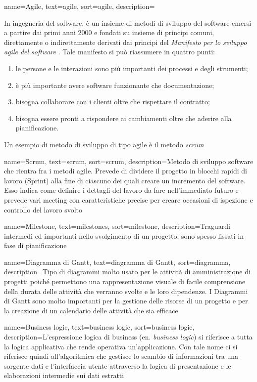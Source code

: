 {
    name=Agile,
    text=agile,
    sort=agile,
    description={In ingegneria del software, è un insieme di metodi di sviluppo del software emersi a partire dai primi anni 2000 e fondati su insieme di principi comuni, direttamente o indirettamente derivati dai principi del \textit{Manifesto per lo sviluppo agile del software} \cite{manifesto}. Tale manifesto si può riassumere in quattro punti:
        \begin{enumerate}
            \item le persone e le interazioni sono più importanti dei processi e degli strumenti;
            \item è più importante avere software funzionante che documentazione;
            \item bisogna collaborare con i clienti oltre che rispettare il contratto;
            \item bisogna essere pronti a rispondere ai cambiamenti oltre che aderire alla pianificazione.
        \end{enumerate}
    Un esempio di metodo di sviluppo di tipo agile è il metodo \emph{\gls{scrum}}\glsfirstoccur}
}

{
    name=Scrum,
    text=scrum,
    sort=scrum,
    description={Metodo di sviluppo software che rientra fra i metodi agile. Prevede di dividere il progetto in blocchi rapidi di lavoro (Sprint) alla fine di ciascuno dei quali creare un incremento del software. Esso indica come definire i dettagli del lavoro da fare nell'immediato futuro e prevede vari meeting con caratteristiche precise per creare occasioni di ispezione e controllo del lavoro svolto}
}

{
    name=Milestone,
    text=milestones,
    sort=milestone,
    description={Traguardi intermedi ed importanti nello svolgimento di un progetto; sono spesso fissati in fase di pianificazione}
}

{
    name=Diagramma di Gantt,
    text=diagramma di Gantt,
    sort=diagramma,
    description={Tipo di diagrammi molto usato per le attività di amministrazione di progetti poiché
        permettono una rappresentazione visuale di facile comprensione della durata delle attività
        che verranno svolte e le loro dipendenze. I Diagrammi di Gantt sono molto importanti
        per la gestione delle risorse di un progetto e per la creazione di un calendario delle attività
        che sia efficace}
}

{
    name=Business logic,
    text=business logic,
    sort=business logic,
    description={L'espressione logica di business (en. \textit{business logic}) si riferisce a tutta la logica applicativa che rende operativa un'applicazione. Con tale nome ci si riferisce quindi all'algoritmica che gestisce lo scambio di informazioni tra una sorgente dati e l'interfaccia utente attraverso la logica di presentazione e le elaborazioni intermedie sui dati estratti
}}

